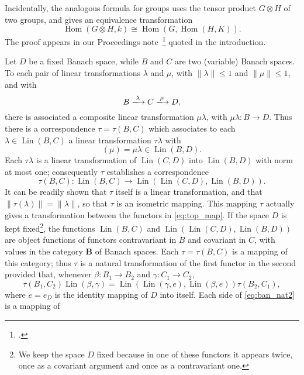 \documentclass[11pt,a4paper]{report}
\DeclareMathOperator{\hm}{Hom}
\DeclareMathOperator{\lin}{Lin}
\begin{document}
Incidentally, the analogous formula for groups uses the tensor product $G\otimes H$ of two groups, and gives
an equivalence transformation
\begin{equation*}
	\hm(G\otimes H, k)\cong\hm(G,\hm(H,K)).
\end{equation*}
The proof appears in our Proceedings note~\footcite{groups42} quoted in the introduction.

Let $D$ be a fixed Banach space, while $B$ and $C$ are two (variable) Banach spaces. To each pair of linear
transformations $\lambda$ and $\mu$, with $\|\lambda\|\le 1$ and $\|\mu\|\le 1$, and with
\begin{equation*}
	B\xlongrightarrow{\lambda} C \xlongrightarrow{\mu} D,
\end{equation*}
there is associated a composite linear transformation $\mu\lambda$, with $\mu\lambda:B\rightarrow D$.
Thus there is a correspondence $\tau=\tau(B,C)$ which associates to each $\lambda\in\lin(B,C)$ a
linear transformation $\tau\lambda$ with
\begin{equation*}
	[\tau\lambda](\mu)=\mu\lambda\in\lin(B,D).
\end{equation*}
Each  $\tau\lambda$ is a linear transformation of $\lin(C,D)$ into $\lin(B,D)$ with norm at most one;
consequently $\tau$ establishes a correspondence
\begin{equation}\label{eq:ban_nat}
	\tau(B,C):\lin(B,C)\rightarrow\lin(\lin(C,D),\lin(B,D)).
\end{equation}
It can be readily shown that $\tau$ itself is a linear transformation, and that $\|\tau(\lambda)\|=\|\lambda\|$,
so that $\tau$ is an isometric mapping.
This mapping $\tau$ actually gives a transformation between the functors in \cref{eq:top_map}.
If the space $D$ is kept fixed\footnote{We keep the space $D$ fixed because in one of these functors it appears twice, once as a
covariant argument and once as a contravariant one.}, the functions $\lin(B,C)$ and $\lin(\lin(C,D),\lin(B,D))$
are object functions of functors contravariant in $B$ and covariant in $C$, with values in the category $\mathbf{B}$
of Banach spaces. Each $\tau=\tau(B,C)$ is a mapping of this category; thus $\tau$ is a natural transformation
of the first functor in the second provided that, whenever $\beta:B_1\rightarrow B_2$ and $\gamma:C_1\rightarrow C_2$,
\begin{equation}\label{eq:ban_nat2}
	\tau(B_1,C_2)\lin(\beta,\gamma) = \lin(\lin(\gamma,e),\lin(\beta,e))\tau(B_2,C_1),
\end{equation}
where $e=e_D$ is the identity mapping of $D$ into itself. Each side of \cref{eq:ban_nat2} is a mapping of
\end{document}
